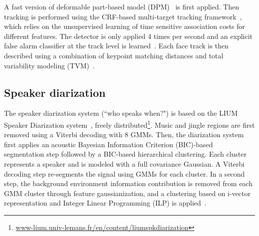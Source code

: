 A fast version of deformable part-based model (DPM)~\cite{dubout2013deformable} is first applied. Then tracking is performed using the CRF-based multi-target tracking framework~\cite{heili2014tracking}, which relies on the unsupervised learning of time sensitive association costs for different features.
%
The detector is only applied 4 times per second and an explicit false alarm classifier at the track level is learned~\cite{Le_ICPR_2016}.
%
Each face track is then described using a combination of keypoint matching distances and total variability modeling (TVM)~\cite{wallace2012total,Khoury:ICMR:2013}.

\subsection{Speaker diarization}

The speaker diarization system (``who speaks when?") is based on the LIUM Speaker Diarization system~\cite{rouvier2013}, freely distributed\footnote{\url{www-lium.univ-lemans.fr/en/content/liumspkdiarization}}. 
%
Music and jingle regions are first removed using a Viterbi decoding with 8 GMMs.
%
Then, the diarization system first applies an acoustic Bayesian Information Criterion (BIC)-based segmentation step followed by a BIC-based hierarchical clustering. Each cluster represents a speaker and is modeled with a full covariance Gaussian. A Viterbi decoding step re-segments the signal using GMMs %
for each cluster. 
%
%
In a second step, the background environment information contribution is removed from each GMM cluster through feature gaussianization,
and a clustering based  on i-vector representation  and Integer Linear Programming (ILP) is applied~\cite{rouvier12-2}. 

